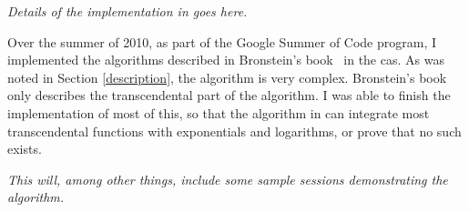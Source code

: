 \emph{Details of the implementation in \sympy goes here.}

Over the summer of 2010, as part of the Goo\-gle Summer of Code program, I
implemented the algorithms described in Bronstein's
book~\cite{bronstein2005symbolic} in the \sympy \gls{cas}.  As was noted
in Section \ref{description}, the algorithm is very complex. 
Bronstein's book only describes the
transcendental%
part of the algorithm. I was able to finish the implementation of most
of this, so that the algorithm in \sympy can integrate most
transcendental functions with exponentials and logarithms, %
or prove that no such \antiderivative exists.  

\emph{This will, among other things, include some sample sessions
demonstrating the algorithm.}
